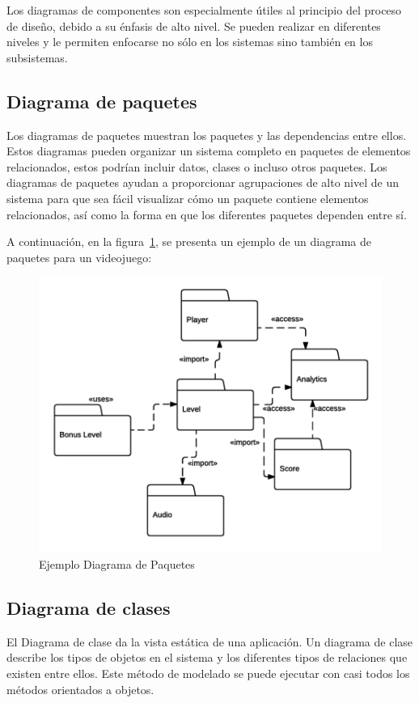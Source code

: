     Los diagramas de componentes son especialmente útiles al principio del proceso de diseño, debido a su énfasis de alto nivel. Se pueden realizar en diferentes niveles y le permiten enfocarse no sólo en los sistemas sino también en los subsistemas.


    \subsection{Diagrama de paquetes}\label{ssc:pack}

    Los diagramas de paquetes muestran los paquetes y las dependencias entre ellos. Estos diagramas pueden organizar un sistema completo en paquetes de elementos relacionados, estos podrían incluir datos, clases o incluso otros paquetes. Los diagramas de paquetes ayudan a proporcionar agrupaciones de alto nivel de un sistema para que sea fácil visualizar cómo un paquete contiene elementos relacionados, así como la forma en que los diferentes paquetes dependen entre sí.

    A continuación, en la figura~\ref{fig:packageDiagram}, se presenta un ejemplo de un diagrama de paquetes para un videojuego:

    \begin{figure}[H]
        \centering
        \includegraphics[width=0.7\linewidth]{imagenes/packageDiagram.png}
        \caption{Ejemplo Diagrama de Paquetes}
        \label{fig:packageDiagram}
    \end{figure}

    \subsection{Diagrama de clases}\label{ssc:clases}

El Diagrama de clase da la vista estática de una aplicación. Un diagrama de clase describe los tipos de objetos en el sistema y los diferentes tipos de relaciones que existen entre ellos. Este método de modelado se puede ejecutar con casi todos los métodos orientados a objetos.

